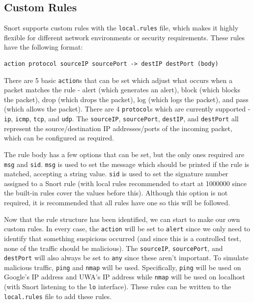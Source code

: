 \hypertarget{custom-rules}{%
\subsection{Custom Rules}\label{custom-rules}}

Snort supports custom rules with the \texttt{local.rules} file, which
makes it highly flexible for different network environments or security
requirements. These rules have the following format:

\begin{verbatim}
action protocol sourceIP sourcePort -> destIP destPort (body)
\end{verbatim}

There are 5 basic \texttt{action}s that can be set which adjust what
occurs when a packet matches the rule - alert (which generates an
alert), block (which blocks the packet), drop (which drops the packet),
log (which logs the packet), and pass (which allows the packet). There
are 4 \texttt{protocol}s which are currently supported - \texttt{ip},
\texttt{icmp}, \texttt{tcp}, and \texttt{udp}. The \texttt{sourceIP},
\texttt{sourcePort}, \texttt{destIP}, and \texttt{destPort} all
represent the source/destination IP addresses/ports of the incoming
packet, which can be configured as required.

The rule body has a few options that can be set, but the only ones
required are \texttt{msg} and \texttt{sid}. \texttt{msg} is used to set
the message which should be printed if the rule is matched, accepting a
string value. \texttt{sid} is used to set the signature number assigned
to a Snort rule (with local rules recommended to start at 1000000 since
the built-in rules cover the values before this). Although this option
is not required, it is recommended that all rules have one so this will
be followed.

Now that the rule structure has been identified, we can start to make
our own custom rules. In every case, the \texttt{action} will be set to
\texttt{alert} since we only need to identify that something suspicious
occurred (and since this is a controlled test, none of the traffic
should be malicious). The \texttt{sourceIP}, \texttt{sourcePort}, and
\texttt{destPort} will also always be set to \texttt{any} since these
aren't important. To simulate malicious traffic, \texttt{ping} and
\texttt{nmap} will be used. Specifically, \texttt{ping} will be used on
Google's IP address and UWA's IP address while \texttt{nmap} will be
used on localhost (with Snort listening to the \texttt{lo} interface).
These rules can be written to the \texttt{local.rules} file to add these
rules.

